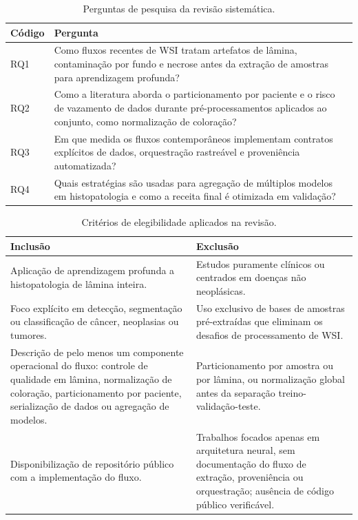 \begin{table}[!htb]
\centering
\caption{Perguntas de pesquisa da revisão sistemática.}
\label{tab:revisao_sistematica_perguntas}
\small
\begin{tabular}{>{\raggedright\arraybackslash}p{2.0cm}>{\raggedright\arraybackslash}p{11.1cm}}
\toprule
Código & Pergunta \\
\midrule
RQ1 & Como fluxos recentes de WSI tratam artefatos de lâmina, contaminação por fundo e necrose antes da extração de amostras para aprendizagem profunda? \\
RQ2 & Como a literatura aborda o particionamento por paciente e o risco de vazamento de dados durante pré-processamentos aplicados ao conjunto, como normalização de coloração? \\
RQ3 & Em que medida os fluxos contemporâneos implementam contratos explícitos de dados, orquestração rastreável e proveniência automatizada? \\
RQ4 & Quais estratégias são usadas para agregação de múltiplos modelos em histopatologia e como a receita final é otimizada em validação? \\
\bottomrule
\end{tabular}
\normalsize
\end{table}

\begin{table}[!htb]
\centering
\caption{Critérios de elegibilidade aplicados na revisão.}
\label{tab:revisao_sistematica_criterios}
\scriptsize
\begin{tabular}{>{\raggedright\arraybackslash}p{6.35cm}>{\raggedright\arraybackslash}p{6.35cm}}
\toprule
Inclusão & Exclusão \\
\midrule
Aplicação de aprendizagem profunda a histopatologia de lâmina inteira. & Estudos puramente clínicos ou centrados em doenças não neoplásicas. \\
Foco explícito em detecção, segmentação ou classificação de câncer, neoplasias ou tumores. & Uso exclusivo de bases de amostras pré-extraídas que eliminam os desafios de processamento de WSI. \\
Descrição de pelo menos um componente operacional do fluxo: controle de qualidade em lâmina, normalização de coloração, particionamento por paciente, serialização de dados ou agregação de modelos. & Particionamento por amostra ou por lâmina, ou normalização global antes da separação treino-validação-teste. \\
Disponibilização de repositório público com a implementação do fluxo. & Trabalhos focados apenas em arquitetura neural, sem documentação do fluxo de extração, proveniência ou orquestração; ausência de código público verificável. \\
\bottomrule
\end{tabular}
\normalsize
\end{table}

